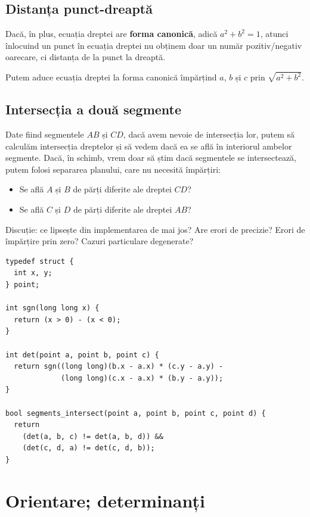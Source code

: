 \documentclass[../main.tex]{subfiles}
\begin{document}
\subsection{Distanța punct-dreaptă}

Dacă, în plus, ecuația dreptei are \textbf{forma canonică}, adică $a^2 + b^2 = 1$, atunci înlocuind un punct în ecuația dreptei nu obținem doar un număr pozitiv/negativ oarecare, ci distanța de la punct la dreaptă.

Putem aduce ecuația dreptei la forma canonică împărțind $a$, $b$ și $c$ prin $\sqrt{a^2 + b^2}$.

\subsection{Intersecția a două segmente}

Date fiind segmentele $AB$ și $CD$, dacă avem nevoie de intersecția lor, putem să calculăm intersecția dreptelor și să vedem dacă ea se află în interiorul ambelor segmente. Dacă, în schimb, vrem doar să știm dacă segmentele se intersectează, putem folosi separarea planului, care nu necesită împărțiri:

\begin{itemize}
  \item Se află $A$ și $B$ de părți diferite ale dreptei $CD$?
  \item Se află $C$ și $D$ de părți diferite ale dreptei $AB$?
\end{itemize}

Discuție: ce lipsește din implementarea de mai jos? Are erori de precizie? Erori de împărțire prin zero? Cazuri particulare degenerate?

\begin{verbatim}
typedef struct {
  int x, y;
} point;

int sgn(long long x) {
  return (x > 0) - (x < 0);
}

int det(point a, point b, point c) {
  return sgn((long long)(b.x - a.x) * (c.y - a.y) -
             (long long)(c.x - a.x) * (b.y - a.y));
}

bool segments_intersect(point a, point b, point c, point d) {
  return
    (det(a, b, c) != det(a, b, d)) &&
    (det(c, d, a) != det(c, d, b));
}
\end{verbatim}

\section{Orientare; determinanți}
\end{document}

